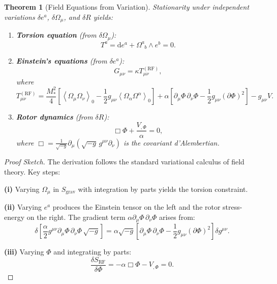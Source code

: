 \documentclass[11pt,a4paper]{article}
\numberwithin{equation}{section}
\theoremstyle{plain}
\newtheorem{theorem}{Theorem}[section]
\theoremstyle{definition}
\theoremstyle{remark}
\newcommand{\grade}[2]{\left\langle #1 \right\rangle_{#2}}
\newcommand{\scal}[1]{\grade{#1}{0}}       %
\newcommand{\dd}{\mathrm{d}}
\begin{document}
\begin{theorem}[Field Equations from Variation]
Stationarity under independent variations $\delta e^a$, $\delta\Omega_\mu$, and $\delta R$ yields:
\begin{enumerate}
\item \textbf{Torsion equation} (from $\delta\Omega_\mu$):
\begin{equation}
T^a = \dd e^a + \Omega^a_{\phantom{a}b} \wedge e^b = 0.
\label{eq:field-torsion}
\end{equation}

\item \textbf{Einstein's equations} (from $\delta e^a$):
\begin{equation}
G_{\mu\nu} = \kappa T_{\mu\nu}^{(\mathrm{RF})},
\label{eq:einstein-derived}
\end{equation}
where
\begin{equation}
T_{\mu\nu}^{(\mathrm{RF})} = \frac{M_*^2}{4}\left[\scal{\Omega_\mu\Omega_\nu} - \frac{1}{2}g_{\mu\nu}\scal{\Omega_\alpha\Omega^\alpha}\right] + \alpha\left[\partial_\mu\Phi\,\partial_\nu\Phi - \frac{1}{2}g_{\mu\nu}(\partial\Phi)^2\right] - g_{\mu\nu}V.
\label{eq:stress-energy-tensor}
\end{equation}

\item \textbf{Rotor dynamics} (from $\delta R$):
\begin{equation}
\Box\Phi + \frac{V_{,\Phi}}{\alpha} = 0,
\label{eq:rotor-kg}
\end{equation}
where $\Box = \frac{1}{\sqrt{-g}}\partial_\mu(\sqrt{-g}\,g^{\mu\nu}\partial_\nu)$ is the covariant d'Alembertian.
\end{enumerate}
\end{theorem}

\begin{proof}[Proof Sketch]
The derivation follows the standard variational calculus of field theory. Key steps:

\textbf{(i)} Varying $\Omega_\mu$ in $S_{\mathrm{grav}}$ with integration by parts yields the torsion constraint.

\textbf{(ii)} Varying $e^a$ produces the Einstein tensor on the left and the rotor stress-energy on the right. The gradient term $\alpha\partial_\mu\Phi\,\partial_\nu\Phi$ arises from:
\begin{equation}
\delta\left[\frac{\alpha}{2}g^{\mu\nu}\partial_\mu\Phi\,\partial_\nu\Phi\,\sqrt{-g}\right] = \alpha\sqrt{-g}\left[\partial_\mu\Phi\,\partial_\nu\Phi - \frac{1}{2}g_{\mu\nu}(\partial\Phi)^2\right]\delta g^{\mu\nu}.
\end{equation}

\textbf{(iii)} Varying $\Phi$ and integrating by parts:
\begin{equation}
\frac{\delta S_{\mathrm{RF}}}{\delta\Phi} = -\alpha\Box\Phi - V_{,\Phi} = 0.
\end{equation}
\end{proof}
\end{document}
